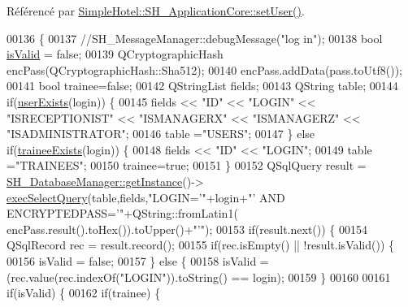 Référencé par \hyperlink{classSimpleHotel_1_1SH__ApplicationCore_a2af3f48e113eaa6771a0fa328bd9f2e1}{Simple\-Hotel\-::\-S\-H\-\_\-\-Application\-Core\-::set\-User()}.


\begin{DoxyCode}
00136 \{
00137    \textcolor{comment}{//SH\_MessageManager::debugMessage("log in");}
00138     \textcolor{keywordtype}{bool} \hyperlink{classSimpleHotel_1_1SH__User_a8b60e67bc474ee97367f36d0278721ca}{isValid} = \textcolor{keyword}{false};
00139     QCryptographicHash encPass(QCryptographicHash::Sha512);
00140     encPass.addData(pass.toUtf8());
00141     \textcolor{keywordtype}{bool} trainee=\textcolor{keyword}{false};
00142     QStringList fields;
00143     QString table;
00144     \textcolor{keywordflow}{if}(\hyperlink{classSimpleHotel_1_1SH__User_ade0c6b106701dd94e78a0cbf116c926d}{userExists}(login)) \{
00145         fields << \textcolor{stringliteral}{"ID"} << \textcolor{stringliteral}{"LOGIN"} << \textcolor{stringliteral}{"ISRECEPTIONIST"} << \textcolor{stringliteral}{"ISMANAGERX"} << \textcolor{stringliteral}{"ISMANAGERZ"} << \textcolor{stringliteral}{"ISADMINISTRATOR"};
00146         table =\textcolor{stringliteral}{"USERS"};
00147     \} \textcolor{keywordflow}{else} \textcolor{keywordflow}{if}(\hyperlink{classSimpleHotel_1_1SH__User_a502467b4e5fbe99a7bb0b07f4eb1cee0}{traineeExists}(login)) \{
00148         fields << \textcolor{stringliteral}{"ID"} << \textcolor{stringliteral}{"LOGIN"};
00149         table =\textcolor{stringliteral}{"TRAINEES"};
00150         trainee=\textcolor{keyword}{true};
00151     \}
00152     QSqlQuery result = \hyperlink{classSimpleHotel_1_1SH__DatabaseManager_a0bcee98b94b5144e4c066000c4ae3321}{SH\_DatabaseManager::getInstance}()->
      \hyperlink{classSimpleHotel_1_1SH__DatabaseManager_ade052bd4f0e6aa490becef78ce4ea4d7}{execSelectQuery}(table,fields,\textcolor{stringliteral}{"LOGIN='"}+login+\textcolor{stringliteral}{"' AND ENCRYPTEDPASS='"}+QString::fromLatin1(
      encPass.result().toHex()).toUpper()+\textcolor{stringliteral}{"'"});
00153     \textcolor{keywordflow}{if}(result.next()) \{
00154         QSqlRecord rec = result.record();
00155         \textcolor{keywordflow}{if}(rec.isEmpty() || !result.isValid()) \{
00156             isValid = \textcolor{keyword}{false};
00157         \} \textcolor{keywordflow}{else} \{
00158             isValid = (rec.value(rec.indexOf(\textcolor{stringliteral}{"LOGIN"})).toString() == login);
00159         \}
00160 
00161         \textcolor{keywordflow}{if}(isValid) \{
00162             \textcolor{keywordflow}{if}(trainee) \{

\end{DoxyCode}

